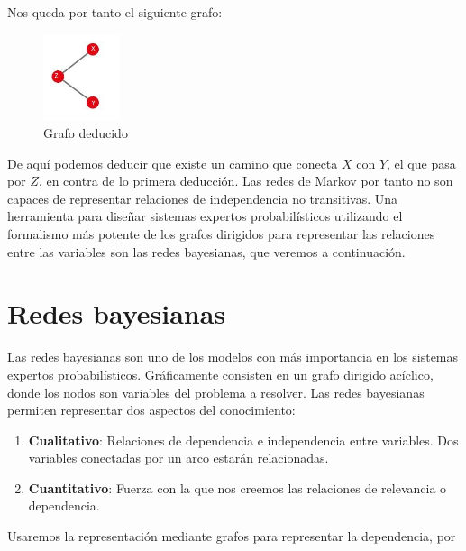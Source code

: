 \documentclass{article}
\begin{document}
\begin{enumerate}
Nos queda por tanto el siguiente grafo:
\begin{figure}[H]
\centering
\includegraphics[width=0.2\textwidth]{grafo}
\caption{Grafo deducido} \label{fig:grafo}
\end{figure}

De aquí podemos deducir que existe un camino que conecta $X$ con $Y$, el que pasa por $Z$, en contra de lo primera deducción. Las redes de Markov por tanto no son capaces de representar relaciones de independencia no transitivas. Una herramienta para diseñar sistemas expertos probabilísticos utilizando el formalismo más potente de los grafos dirigidos para representar las relaciones entre las variables son las redes bayesianas, que veremos a continuación.
\end{enumerate}

\section{Redes bayesianas}

Las redes bayesianas son uno de los modelos con más importancia en los sistemas expertos probabilísticos. Gráficamente consisten en un grafo dirigido acíclico, donde los nodos son variables del problema a resolver. Las redes bayesianas permiten representar dos aspectos del conocimiento:

\begin{enumerate}
\item \textbf{Cualitativo}: Relaciones de dependencia e independencia entre variables. Dos variables conectadas por un arco estarán relacionadas.
\item \textbf{Cuantitativo}: Fuerza con la que nos creemos las relaciones de relevancia o dependencia.
\end{enumerate}

Usaremos la representación mediante grafos para representar la dependencia, por

\begin{center}
\end{center}
\end{document}
